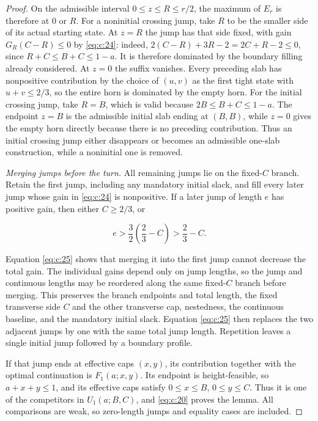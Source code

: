 \begin{proof}
On the admissible interval \(0\le z\le R\le r/2\), the maximum of \(E_r\)
is therefore at \(0\) or \(R\). For a noninitial crossing jump, take \(R\)
to be the smaller side of its actual starting state. At \(z=R\) the jump has
that side fixed, with gain \(G_R(C-R)\le0\) by \eqref{eq:c:24}: indeed,
\(2(C-R)+3R-2=2C+R-2\le0\), since \(R+C\le B+C\le1-a\).
It is therefore dominated by the boundary filling already considered.
At \(z=0\) the suffix vanishes. Every preceding slab has nonpositive
contribution by the choice of \((u,v)\) as the first tight state with
\(u+v\le2/3\), so the entire horn is dominated by the empty horn.
For the initial crossing jump, take \(R=B\), which is valid because
\(2B\le B+C\le1-a\). The endpoint \(z=B\) is the admissible initial slab
ending at \((B,B)\), while \(z=0\) gives the empty horn directly because
there is no preceding contribution. Thus an initial crossing jump either
disappears or becomes an admissible one-slab construction, while a
noninitial one is removed.

\smallskip\noindent\emph{Merging jumps before the turn.}
All remaining jumps lie on the fixed-\(C\) branch. Retain the first jump,
including any mandatory initial slack, and fill every later jump whose gain
in \eqref{eq:c:24} is nonpositive. If a later jump of length \(e\) has positive gain,
then either \(C\ge2/3\), or

\[
e>\frac32\left(\frac23-C\right)>\frac23-C.
\]

Equation \eqref{eq:c:25} shows that merging it into the first jump cannot decrease the
total gain. The individual gains depend only on jump lengths, so the jump and
continuous lengths may be reordered along the same fixed-\(C\) branch before
merging. This preserves the branch endpoints and total length, the fixed
transverse side \(C\) and the other transverse cap, nestedness, the continuous
baseline, and the mandatory initial slack. Equation \eqref{eq:c:25} then
replaces the two adjacent jumps by one with the same total jump length.
Repetition leaves a single initial jump followed by a boundary profile.

If that jump ends at effective caps \((x,y)\), its contribution together with
the optimal continuation is \(F_1(a;x,y)\). Its endpoint is height-feasible,
so \(a+x+y\le1\), and its effective caps satisfy
\(0\le x\le B\), \(0\le y\le C\). Thus it is one of the competitors in
\(U_1(a;B,C)\), and \eqref{eq:c:20} proves the lemma. All comparisons are
weak, so zero-length jumps and equality cases are included.
\end{proof}

